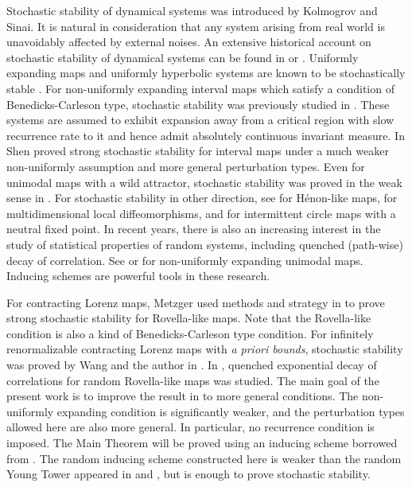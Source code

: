 \documentclass[11pt,oneside]{article}
\theoremstyle{plain}
\numberwithin{equation}{section}
\numberwithin{figure}{section}
\numberwithin{table}{section}
\begin{document}
Stochastic stability of dynamical systems was introduced by Kolmogrov and Sinai. It is natural in consideration that any system arising from real world is unavoidably affected by external noises. An extensive historical account on stochastic stability of dynamical systems can be found in \cite{BDV} or \cite{V}. Uniformly expanding maps and uniformly hyperbolic systems are known to be stochastically stable \cite{Ki1}. For non-uniformly expanding interval maps which satisfy a condition of Benedicks-Carleson type, stochastic stability was previously studied in \cite{BV, BY, Ts}. These systems are assumed to exhibit expansion away from a critical region with slow recurrence rate to it and hence admit absolutely continuous invariant measure. In \cite{S} Shen proved strong stochastic stability for interval maps under a much weaker non-uniformly assumption and more general perturbation types. Even for unimodal maps with a wild attractor, stochastic stability was proved in the weak sense in \cite{LW}. For stochastic stability in other direction, see \cite{BV} for H\'enon-like maps, \cite{AA, AV} for multidimensional local diffeomorphisms, and \cite{SvS} for intermittent circle maps with a neutral fixed point. In recent years, there is also an increasing interest in the study of statistical properties of random systems, including quenched (path-wise) decay of correlation. See \cite{BBM} or \cite{D} for non-uniformly expanding unimodal maps. Inducing schemes are powerful tools in these research.



For contracting Lorenz maps, Metzger \cite{Me} used methods and strategy in \cite{BV} to prove strong stochastic stability for Rovella-like maps. Note that the Rovella-like condition is also a kind of Benedicks-Carleson type condition. For infinitely renormalizable contracting Lorenz maps with {\it a priori bounds}, stochastic stability was proved by Wang and the author in \cite{JW}. In \cite{LR}, quenched exponential decay of correlations for random Rovella-like maps was studied. The main goal of the present work is to improve the result in \cite{Me} to more general conditions. The non-uniformly expanding condition is significantly weaker, and the perturbation types allowed here are also more general. In particular, no recurrence condition is imposed. The Main Theorem will be proved using an inducing scheme borrowed from \cite{S}. The random inducing scheme constructed here is weaker than the random Young Tower appeared in \cite{AV} and \cite{D}, but is enough to prove stochastic stability. 
\end{document}
